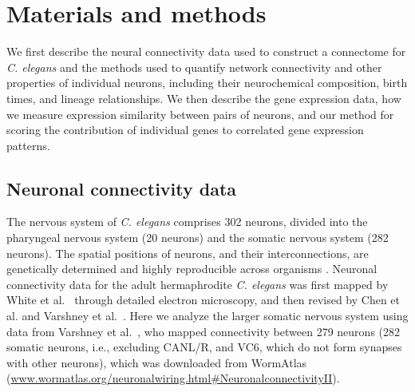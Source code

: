 \documentclass[10pt,letterpaper]{article}
\begin{document}
\section*{Materials and methods}

We first describe the neural connectivity data used to construct a connectome for \textit{C. elegans} and the methods used to quantify network connectivity and other properties of individual neurons, including their neurochemical composition, birth times, and lineage relationships.
We then describe the gene expression data, how we measure expression similarity between pairs of neurons, and our method for scoring the contribution of individual genes to correlated gene expression patterns.


\subsection*{Neuronal connectivity data}
The nervous system of \emph{C. elegans} comprises 302 neurons, divided into the pharyngeal nervous system (20 neurons) and the somatic nervous system (282 neurons).
The spatial positions of neurons, and their interconnections, are genetically determined and highly reproducible across organisms \cite{Riddle1997}.
Neuronal connectivity data for the adult hermaphrodite \emph{C. elegans} was first mapped by White et al.~\cite{White:1986tx} through detailed electron microscopy, and then revised by Chen et al. \cite{Chen:2006ie} and Varshney et al.~\cite{Varshney2011}.
Here we analyze the larger somatic nervous system using data from Varshney et al.~\cite{Varshney2011}, who mapped connectivity between 279 neurons (282 somatic neurons, i.e., excluding CANL/R, and VC6, which do not form synapses with other neurons), which was downloaded from WormAtlas \cite{WormAtlas} (\url{www.wormatlas.org/neuronalwiring.html#NeuronalconnectivityII}).
\end{document}
